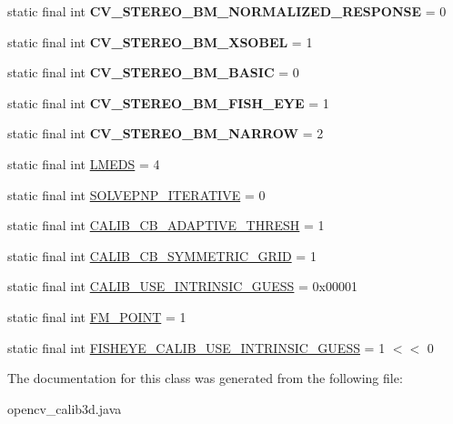 \begin{DoxyCompactItemize}
static final int {\bfseries C\+V\+\_\+\+S\+T\+E\+R\+E\+O\+\_\+\+B\+M\+\_\+\+N\+O\+R\+M\+A\+L\+I\+Z\+E\+D\+\_\+\+R\+E\+S\+P\+O\+N\+SE} = 0
\item 
static final int {\bfseries C\+V\+\_\+\+S\+T\+E\+R\+E\+O\+\_\+\+B\+M\+\_\+\+X\+S\+O\+B\+EL} = 1
\item 
static final int {\bfseries C\+V\+\_\+\+S\+T\+E\+R\+E\+O\+\_\+\+B\+M\+\_\+\+B\+A\+S\+IC} = 0
\item 
static final int {\bfseries C\+V\+\_\+\+S\+T\+E\+R\+E\+O\+\_\+\+B\+M\+\_\+\+F\+I\+S\+H\+\_\+\+E\+YE} = 1
\item 
static final int {\bfseries C\+V\+\_\+\+S\+T\+E\+R\+E\+O\+\_\+\+B\+M\+\_\+\+N\+A\+R\+R\+OW} = 2
\item 
static final int \hyperlink{group__calib3d_ga7e1c52453b9e9c9ab4bad14cda6c4bf0}{L\+M\+E\+DS} = 4
\item 
static final int \hyperlink{group__calib3d_ga6ffcad9be73e952b7d77514029955df4}{S\+O\+L\+V\+E\+P\+N\+P\+\_\+\+I\+T\+E\+R\+A\+T\+I\+VE} = 0
\item 
static final int \hyperlink{group__calib3d_gafb359ad540f439e22ec524accd18035a}{C\+A\+L\+I\+B\+\_\+\+C\+B\+\_\+\+A\+D\+A\+P\+T\+I\+V\+E\+\_\+\+T\+H\+R\+E\+SH} = 1
\item 
static final int \hyperlink{group__calib3d_gad2f624be59f3f688026e8da4a9fdd54f}{C\+A\+L\+I\+B\+\_\+\+C\+B\+\_\+\+S\+Y\+M\+M\+E\+T\+R\+I\+C\+\_\+\+G\+R\+ID} = 1
\item 
static final int \hyperlink{group__calib3d_gaf431715014a51d3ef90634667102d383}{C\+A\+L\+I\+B\+\_\+\+U\+S\+E\+\_\+\+I\+N\+T\+R\+I\+N\+S\+I\+C\+\_\+\+G\+U\+E\+SS} = 0x00001
\item 
static final int \hyperlink{group__calib3d_ga9409961aa623a3fc37210e6b332447fa}{F\+M\+\_\+P\+O\+I\+NT} = 1
\item 
static final int \hyperlink{group__calib3d__fisheye_gac6c55e6235a136952116d157a197869c}{F\+I\+S\+H\+E\+Y\+E\+\_\+\+C\+A\+L\+I\+B\+\_\+\+U\+S\+E\+\_\+\+I\+N\+T\+R\+I\+N\+S\+I\+C\+\_\+\+G\+U\+E\+SS} = 1 $<$$<$ 0
\end{DoxyCompactItemize}


The documentation for this class was generated from the following file\+:\begin{DoxyCompactItemize}
\item 
opencv\+\_\+calib3d.\+java\end{DoxyCompactItemize}

